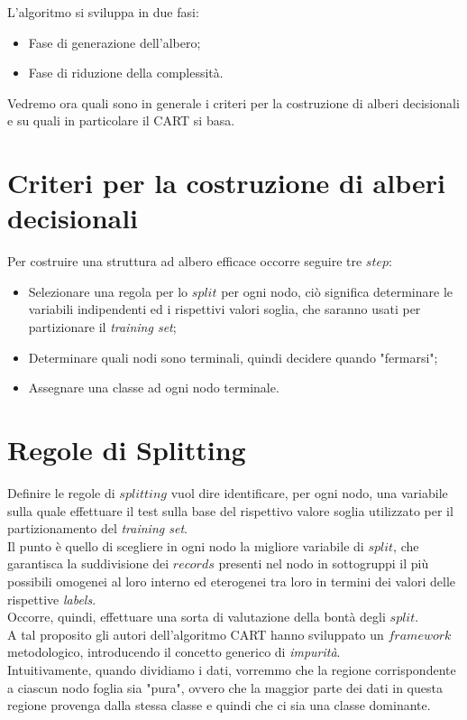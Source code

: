 L'algoritmo si sviluppa in due fasi:
\begin{itemize}
    \item Fase di generazione dell'albero; 
    \item Fase di riduzione della complessità.
\end{itemize}
Vedremo ora quali sono in generale i criteri per la costruzione di alberi decisionali e su quali in particolare il CART si basa.

\section{Criteri per la costruzione di alberi decisionali}
Per costruire una struttura ad albero efficace occorre seguire tre $step$:
\begin{itemize}
    \item Selezionare una regola per lo $split$ per ogni nodo, ciò significa determinare le variabili indipendenti ed i rispettivi valori soglia, che saranno usati per partizionare il \textit{training set};
    \item Determinare quali nodi sono terminali, quindi decidere quando "fermarsi";
    \item Assegnare una classe ad ogni nodo terminale.
\end{itemize}

\section{Regole di Splitting}
Definire le regole di $splitting$ vuol dire identificare, per ogni nodo, una variabile sulla quale effettuare il test sulla base del rispettivo valore soglia utilizzato per il partizionamento del \textit{training set}.\\
Il punto è quello di scegliere in ogni nodo la migliore variabile di $split$, che garantisca la suddivisione dei $records$ presenti nel nodo in sottogruppi il più possibili omogenei al loro interno ed eterogenei tra loro in termini dei valori delle rispettive \textit{labels}.\\
Occorre, quindi, effettuare una sorta di valutazione della bontà degli $split$.\\
A tal proposito gli autori dell'algoritmo CART hanno sviluppato un $framework$ metodologico, introducendo il concetto generico di \textit{impurità}.\\
Intuitivamente, quando dividiamo i dati, vorremmo che la regione corrispondente a ciascun nodo foglia sia "pura", ovvero che la maggior parte dei dati in questa regione provenga dalla stessa classe e quindi che ci sia una classe dominante.

